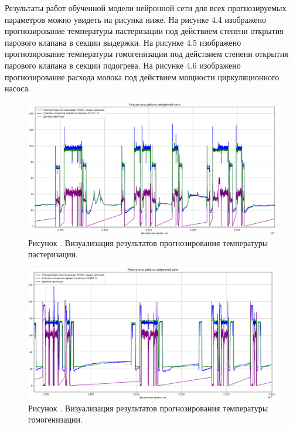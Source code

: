 {  \par \redline Результаты работ обученной модели нейронной сети для всех прогнозируемых параметров можно увидеть на рисунка ниже. На рисунке 4.4 изображено прогнозирование температуры пастеризации под действием степени открытия парового клапана в секции выдержки. На рисунке 4.5 изображено прогнозирование температуры гомогенизации под действием степени открытия парового клапана в секции подогрева. На рисунке 4.6 изображено прогнозирование расхода молока под действием мощности циркуляционного насоса.  

  \begin{figure}
    \centering
    \def\svgwidth{\textwidth}
    \includegraphics[width=\textheight]{images/TE101test.png}
    \caption*{\gostFont Рисунок \thechaptercntr .\theimagecntr \spc {--} Визуализация результатов прогнозирования температуры пастеризации.}
    \label{fig:Data1VisualAnomaly}
  \end{figure} \addtocounter{imagecntr}{1}

  \begin{figure}
    \centering
    \def\svgwidth{\textwidth}
    \includegraphics[width=\textheight]{images/TE100test.png}
    \caption*{\gostFont Рисунок \thechaptercntr .\theimagecntr \spc {--} Визуализация результатов прогнозирования температуры гомогенизации.}
    \label{fig:Data1VisualAnomaly}
  \end{figure} \addtocounter{imagecntr}{1}

}
